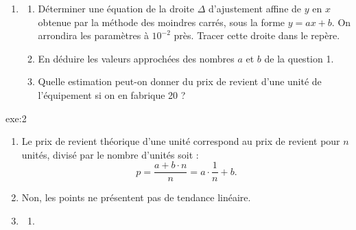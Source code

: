 {\begin{enumerate}
\begin{enumerate}
\item Calculer les valeurs approchées des valeurs $x_i$ à $10^{-2}$ près et les présenter dans un tableau avec les valeurs de $y_i$, sur le modèle de la question précédente.

\item Représenter le nuage de points $P_i$ de coordonnées $(x_i \, ; \, y_i)$ dans un repère orthogonal, en prenant pour unités graphiques :
\begin{itemize}
    \item en abscisses : 1 cm pour 0,1 unité ;
    \item en ordonnées : 1 cm pour 100 \euro.
\end{itemize}

\item Un ajustement affine paraît-il justifié ?
\end{enumerate}

\item 

\begin{enumerate}
\item Déterminer une équation de la droite $\Delta$ d'ajustement affine de $y$ en $x$ obtenue par la méthode des moindres carrés,
sous la forme $y=ax+b$. On arrondira les paramètres à $10^{-2}$ près. Tracer cette droite dans le repère.

\item En déduire les valeurs approchées des nombres $a$ et $b$ de la question 1.

\item Quelle estimation peut-on donner du prix de revient d’une unité de l’équipement si on en fabrique 20 ?
\end{enumerate}

\end{enumerate}
}{exe:2}{
\begin{enumerate}

\item Le prix de revient théorique d'une unité correspond au prix de revient pour $n$ unités, divisé par le nombre d'unités soit :
\[ p = \dfrac{a + b \cdot n}{n} = a \cdot \dfrac{1}{n} + b . \]

\item Non, les points ne présentent pas de tendance linéaire.

\item 

\begin{enumerate}
\item



\end{enumerate}
\end{enumerate}}
